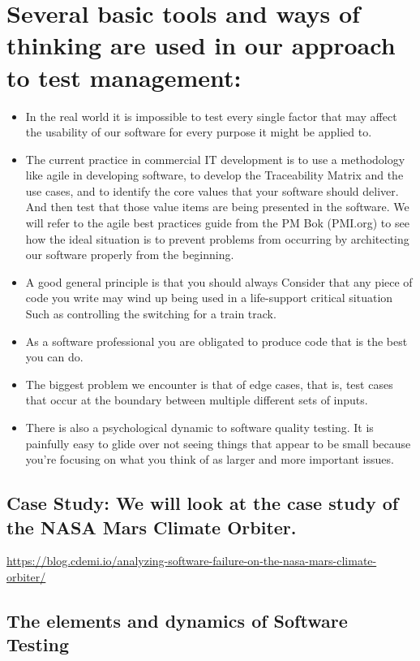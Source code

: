 \section * {Several basic tools and ways of thinking are used in our approach to test management:}
\begin{itemize}
    \item In the real world it is impossible to test every single factor that may affect the usability of our software for every purpose it might be applied to.
    \item    The current practice in commercial IT development is to use a methodology like agile in developing software, to develop the Traceability Matrix and the use cases, and to identify the core values that your software should deliver. And then test that those value items are being presented in the software. We will refer to the agile best practices guide from the PM Bok (PMI.org) to see how the ideal situation is to prevent problems from occurring by architecting our software properly from the beginning. 
    \item   A good general principle is that you should always Consider that any piece of code you write may wind up being used in a life-support critical situation Such as controlling the switching for a train track.     
    \item As a software professional you are obligated to produce code that is the best you can do.
    \item The biggest problem we encounter is that of edge cases, that is, test cases that occur at the boundary between multiple different sets of inputs.
  
    \item   There is also a psychological dynamic to software quality testing. It is painfully easy to glide over not seeing things that appear to be small because you're focusing on what you think of as larger and more important issues.
    
\end{itemize}



 
\subsection * {Case Study: We will look at the case study of the NASA Mars Climate Orbiter.} \url{https://blog.cdemi.io/analyzing-software-failure-on-the-nasa-mars-climate-orbiter/  }

\subsection * {The elements and dynamics of Software Testing}

